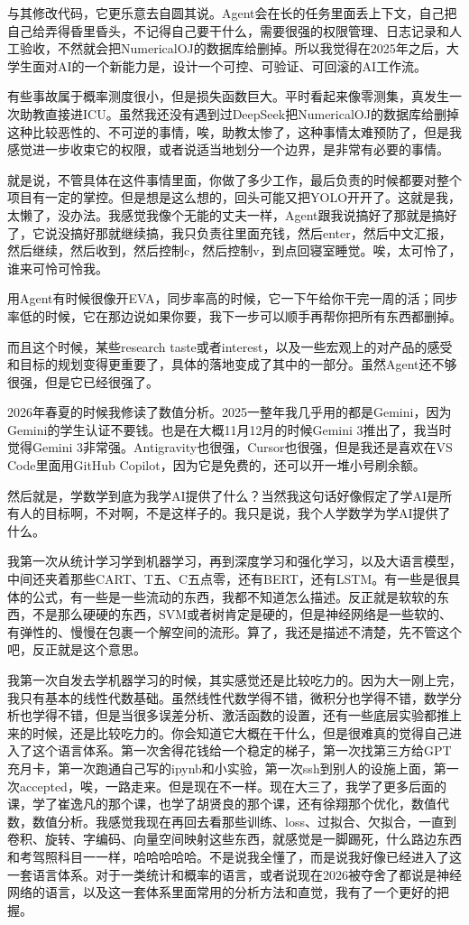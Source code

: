 与其修改代码，它更乐意去自圆其说。Agent会在长的任务里面丢上下文，自己把自己给弄得昏里昏头，不记得自己要干什么，需要很强的权限管理、日志记录和人工验收，不然就会把NumericalOJ的数据库给删掉。所以我觉得在2025年之后，大学生面对AI的一个新能力是，设计一个可控、可验证、可回滚的AI工作流。

有些事故属于概率测度很小，但是损失函数巨大。平时看起来像零测集，真发生一次助教直接进ICU。虽然我还没有遇到过DeepSeek把NumericalOJ的数据库给删掉这种比较恶性的、不可逆的事情，唉，助教太惨了，这种事情太难预防了，但是我感觉进一步收束它的权限，或者说适当地划分一个边界，是非常有必要的事情。

就是说，不管具体在这件事情里面，你做了多少工作，最后负责的时候都要对整个项目有一定的掌控。但是想是这么想的，回头可能又把YOLO开开了。这就是我，太懒了，没办法。我感觉我像个无能的丈夫一样，Agent跟我说搞好了那就是搞好了，它说没搞好那就继续搞，我只负责往里面充钱，然后enter，然后中文汇报，然后继续，然后收到，然后控制c，然后控制v，到点回寝室睡觉。唉，太可怜了，谁来可怜可怜我。

用Agent有时候很像开EVA，同步率高的时候，它一下午给你干完一周的活；同步率低的时候，它在那边说如果你要，我下一步可以顺手再帮你把所有东西都删掉。

而且这个时候，某些research taste或者interest，以及一些宏观上的对产品的感受和目标的规划变得更重要了，具体的落地变成了其中的一部分。虽然Agent还不够很强，但是它已经很强了。

2026年春夏的时候我修读了数值分析。2025一整年我几乎用的都是Gemini，因为Gemini的学生认证不要钱。也是在大概11月12月的时候Gemini 3推出了，我当时觉得Gemini 3非常强。Antigravity也很强，Cursor也很强，但是我还是喜欢在VS Code里面用GitHub Copilot，因为它是免费的，还可以开一堆小号刷余额。

然后就是，学数学到底为我学AI提供了什么？当然我这句话好像假定了学AI是所有人的目标啊，不对啊，不是这样子的。我只是说，我个人学数学为学AI提供了什么。

我第一次从统计学习学到机器学习，再到深度学习和强化学习，以及大语言模型，中间还夹着那些CART、T五、C五点零，还有BERT，还有LSTM。有一些是很具体的公式，有一些是一些流动的东西，我都不知道怎么描述。反正就是软软的东西，不是那么硬硬的东西，SVM或者树肯定是硬的，但是神经网络是一些软的、有弹性的、慢慢在包裹一个解空间的流形。算了，我还是描述不清楚，先不管这个吧，反正就是这个意思。

我第一次自发去学机器学习的时候，其实感觉还是比较吃力的。因为大一刚上完，我只有基本的线性代数基础。虽然线性代数学得不错，微积分也学得不错，数学分析也学得不错，但是当很多误差分析、激活函数的设置，还有一些底层实验都推上来的时候，还是比较吃力的。你会知道它大概在干什么，但是很难真的觉得自己进入了这个语言体系。第一次舍得花钱给一个稳定的梯子，第一次找第三方给GPT充月卡，第一次跑通自己写的ipynb和小实验，第一次ssh到别人的设施上面，第一次accepted，唉，一路走来。但是现在不一样。现在大三了，我学了更多后面的课，学了崔逸凡的那个课，也学了胡贤良的那个课，还有徐翔那个优化，数值代数，数值分析。我感觉我现在再回去看那些训练、loss、过拟合、欠拟合，一直到卷积、旋转、字编码、向量空间映射这些东西，就感觉是一脚踢死，什么路边东西和考驾照科目一一样，哈哈哈哈哈。不是说我全懂了，而是说我好像已经进入了这一套语言体系。对于一类统计和概率的语言，或者说现在2026被夺舍了都说是神经网络的语言，以及这一套体系里面常用的分析方法和直觉，我有了一个更好的把握。

